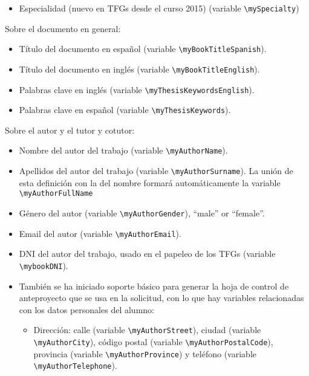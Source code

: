 {\begin{itemize}
    \item Especialidad (nuevo en TFGs desde el curso 2015) (variable \texttt{\textbackslash{}mySpecialty})

  \end{itemize}

  Sobre el documento en general:

  \begin{itemize}
    \item Título del documento en español (variable \texttt{\textbackslash{}myBookTitleSpanish}).
    \item Título del documento en inglés (variable \texttt{\textbackslash{}myBookTitleEnglish}).
    \item Palabras clave en inglés (variable \texttt{\textbackslash{}myThesisKeywordsEnglish}).
    \item Palabras clave en español (variable \texttt{\textbackslash{}myThesisKeywords}).


  \end{itemize}

  Sobre el autor y el tutor y cotutor:

  \begin{itemize}

    \item Nombre del autor del trabajo (variable \texttt{\textbackslash{}myAuthorName}).
    \item Apellidos del autor del trabajo (variable \texttt{\textbackslash{}myAuthorSurname}). La unión de esta definición con la del nombre formará automáticamente la variable \texttt{\textbackslash{}myAuthorFullName}
    \item Género del autor (variable \texttt{\textbackslash{}myAuthorGender}), ``male'' or ``female''.
    \item Email del autor (variable \texttt{\textbackslash{}myAuthorEmail}).
    \item DNI del autor del trabajo, usado en el papeleo de los TFGs (variable \texttt{\textbackslash{}mybookDNI}).

    \item También se ha iniciado soporte básico para generar la hoja de control de anteproyecto que se usa en la solicitud, con lo que hay variables relacionadas con los datos personales del alumno:

          \begin{itemize}
            \item Dirección: calle (variable \texttt{\textbackslash{}myAuthorStreet}), ciudad (variable \texttt{\textbackslash{}myAuthorCity}), código postal (variable \texttt{\textbackslash{}myAuthorPostalCode}), provincia (variable \texttt{\textbackslash{}myAuthorProvince}) y teléfono (variable \texttt{\textbackslash{}myAuthorTelephone}).
          \end{itemize}


\end{itemize}}
